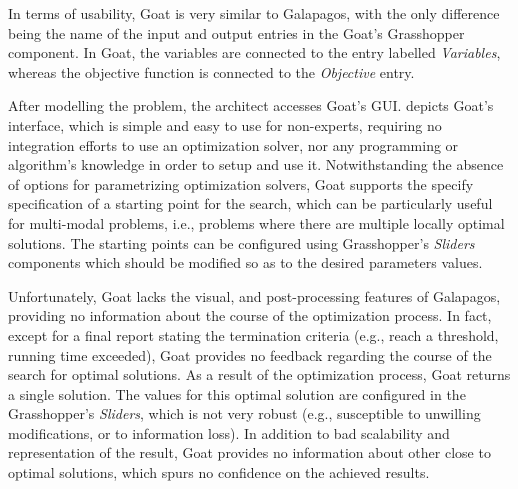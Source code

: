	In terms of usability, Goat is very similar to Galapagos, with the only difference being the name of the input and output entries in the Goat's Grasshopper component. In Goat, the variables are connected to the entry labelled \textit{Variables}, whereas the objective function is connected to the \textit{Objective} entry. 
		
	After modelling the problem, the architect accesses Goat's \ac{GUI}.  depicts Goat's interface, which is simple and easy to use for non-experts, requiring no integration efforts to use an optimization solver, nor any programming or algorithm's knowledge in order to setup and use it. Notwithstanding the absence of options for parametrizing optimization solvers, Goat supports the specify specification of a starting point for the search, which can be particularly useful for multi-modal problems, i.e., problems where there are multiple locally optimal solutions. The starting points can be configured using Grasshopper's \textit{Sliders} components which should be modified so as to the desired parameters values. 
	
	Unfortunately, Goat lacks the visual, and post-processing features of Galapagos, providing no information about the course of the optimization process. In fact, except for a final report stating the termination criteria (e.g., reach a threshold, running time exceeded), Goat provides no feedback regarding the course of the search for optimal solutions. As a result of the optimization process, Goat returns a single solution. The values for this optimal solution are configured in the Grasshopper's \textit{Sliders}, which is not very robust (e.g., susceptible to unwilling modifications, or to information loss). In addition to bad scalability and representation of the result, Goat provides no information about other close to optimal solutions, which spurs no confidence on the achieved results. 

	
	
